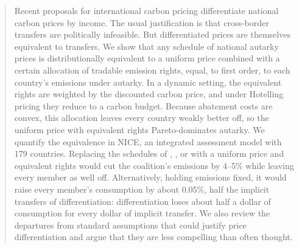 \documentclass[12pt,english]{article}
\theoremstyle{remark}
\begin{document}
\begin{abstract}
\noindent Recent proposals for international carbon pricing differentiate national carbon prices by income. The usual justification is that cross-border transfers are politically infeasible. But differentiated prices are themselves equivalent to transfers. We show that any schedule of national autarky prices is distributionally equivalent to a uniform price combined with a certain allocation of tradable emission rights, equal, to first order, to each country's emissions under autarky.
In a dynamic setting, the equivalent rights are weighted by the discounted carbon price, and under Hotelling pricing they reduce to a carbon budget. Because abatement costs are convex, this allocation leaves every country weakly better off, so the uniform price with equivalent rights Pareto-dominates autarky. %
We quantify the equivalence in NICE, an integrated assessment model with 179 countries. %
Replacing the schedules of \citet{parry_proposal_2021}, \citet{wolfram_building_2025}, or \citet{banerjee_grand_2025} with a uniform price and equivalent rights would cut the coalition's emissions by 4--5\% while leaving every member as well off. Alternatively, holding emissions fixed, it would raise every member's consumption by about 0.05\%, half the implicit transfers of differentiation: differentiation loses about half a dollar of consumption for every dollar of implicit transfer. %
We also review the departures from standard assumptions that could justify price differentiation and argue that they are less compelling than often thought. %


\end{abstract}
\end{document}
